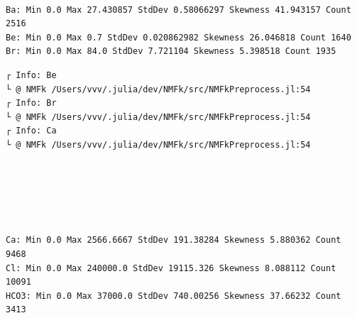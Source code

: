 \documentclass[11pt]{article}
\begin{document}
    \begin{center}
    \end{center}
    { \hspace*{\fill} \\}
    
    \begin{Verbatim}[commandchars=\\\{\}]
Ba: Min 0.0 Max 27.430857 StdDev 0.58066297 Skewness 41.943157 Count 2516
Be: Min 0.0 Max 0.7 StdDev 0.020862982 Skewness 26.046818 Count 1640
Br: Min 0.0 Max 84.0 StdDev 7.721104 Skewness 5.398518 Count 1935
    \end{Verbatim}

    \begin{Verbatim}[commandchars=\\\{\}]
┌ Info: Be
└ @ NMFk /Users/vvv/.julia/dev/NMFk/src/NMFkPreprocess.jl:54
┌ Info: Br
└ @ NMFk /Users/vvv/.julia/dev/NMFk/src/NMFkPreprocess.jl:54
┌ Info: Ca
└ @ NMFk /Users/vvv/.julia/dev/NMFk/src/NMFkPreprocess.jl:54
    \end{Verbatim}

    \begin{center}
    \end{center}
    { \hspace*{\fill} \\}
    
    \begin{center}
    \end{center}
    { \hspace*{\fill} \\}
    
    \begin{center}
    \end{center}
    { \hspace*{\fill} \\}
    
    \begin{Verbatim}[commandchars=\\\{\}]
Ca: Min 0.0 Max 2566.6667 StdDev 191.38284 Skewness 5.880362 Count 9468
Cl: Min 0.0 Max 240000.0 StdDev 19115.326 Skewness 8.088112 Count 10091
HCO3: Min 0.0 Max 37000.0 StdDev 740.00256 Skewness 37.66232 Count 3413
    \end{Verbatim}
\end{document}
